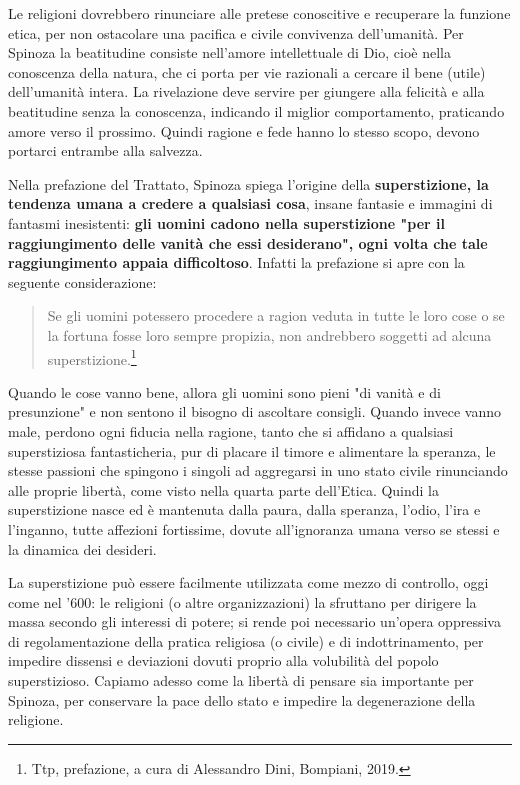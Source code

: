 Le religioni dovrebbero rinunciare alle pretese conoscitive e recuperare la funzione etica, per non ostacolare una pacifica e civile convivenza dell'umanità. Per Spinoza la beatitudine consiste nell'amore intellettuale di Dio, cioè nella conoscenza della natura, che ci porta per vie razionali a cercare il bene (utile) dell'umanità intera. La rivelazione deve servire per giungere alla felicità e alla beatitudine senza la conoscenza, indicando il miglior comportamento, praticando amore verso il prossimo. Quindi ragione e fede hanno lo stesso scopo, devono portarci entrambe alla salvezza.

Nella prefazione del Trattato, Spinoza spiega l'origine della \textbf{superstizione, la tendenza umana a credere a qualsiasi cosa}, insane fantasie e immagini di fantasmi inesistenti: \textbf{gli uomini cadono nella superstizione "per il raggiungimento delle vanità che essi
desiderano"}\textbf{, ogni volta che tale raggiungimento appaia difficoltoso}. Infatti la prefazione si
apre con la seguente considerazione: 

\begin{quotation}
	\small Se gli uomini potessero procedere a ragion veduta in tutte le
	loro cose o se la fortuna fosse loro sempre propizia, non andrebbero soggetti ad alcuna
	superstizione.\footnote{Ttp, prefazione, a cura di Alessandro Dini, Bompiani, 2019.}
\end{quotation}

Quando le cose vanno bene, allora gli uomini sono pieni "di vanità e di
presunzione" e non sentono il bisogno di ascoltare consigli. Quando invece vanno
male, perdono ogni fiducia nella ragione, tanto che si affidano a qualsiasi
superstiziosa fantasticheria, pur di placare il timore e alimentare la speranza, le stesse passioni che spingono i singoli ad aggregarsi in uno stato civile rinunciando alle proprie libertà, come visto nella quarta parte dell'Etica. Quindi la superstizione nasce ed è mantenuta dalla paura, dalla speranza, l'odio, l'ira e l'inganno, tutte affezioni fortissime, dovute all'ignoranza umana verso se stessi e la dinamica dei desideri.

La superstizione può essere facilmente utilizzata come mezzo di controllo, oggi come nel '600: le religioni (o altre organizzazioni) la sfruttano per dirigere la massa secondo gli interessi di potere; si rende poi necessario un'opera oppressiva di regolamentazione della pratica religiosa (o civile) e di indottrinamento, per impedire dissensi e deviazioni dovuti proprio alla volubilità del popolo superstizioso. Capiamo adesso come la libertà di pensare sia importante per Spinoza, per conservare la pace dello stato e impedire la degenerazione della religione.

